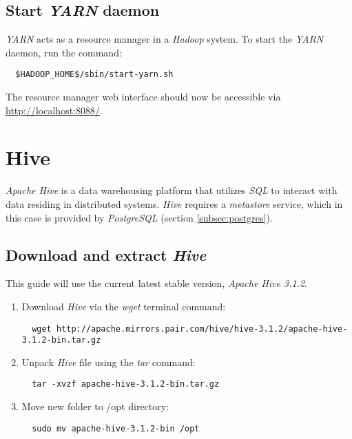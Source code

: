 \documentclass{article}
\begin{document}
  \subsection{Start \emph{YARN} daemon}
  \emph{YARN} acts as a resource manager in a \emph{Hadoop} system. To start the \emph{YARN}
  daemon, run the command:
  \begin{verbatim}
  $HADOOP_HOME$/sbin/start-yarn.sh
  \end{verbatim}
  The resource manager web interface should now be accessible via
  \url{http://localhost:8088/}.

\newpage
\section{Hive}
\emph{Apache Hive} is a data warehousing platform that utilizes \emph{SQL} to interact with
data residing in distributed systems. \emph{Hive} requires a \emph{metastore} service, which in this
case is provided by \emph{PostgreSQL} (section \ref{subsec:postgres}).

  \subsection{Download and extract \emph{Hive}}
  This guide will use the current latest stable version, \emph{Apache Hive 3.1.2}.
  \begin{enumerate}
  \item Download \emph{Hive} via the \emph{wget} terminal command:
  \begin{verbatim}
  wget http://apache.mirrors.pair.com/hive/hive-3.1.2/apache-hive-3.1.2-bin.tar.gz
  \end{verbatim}

  \item Unpack \emph{Hive} file using the \emph{tar} command:
  \begin{verbatim}
  tar -xvzf apache-hive-3.1.2-bin.tar.gz
  \end{verbatim}

  \item Move new folder to /opt directory:
  \begin{verbatim}
  sudo mv apache-hive-3.1.2-bin /opt
  \end{verbatim}
  \end{enumerate}
\end{document}
